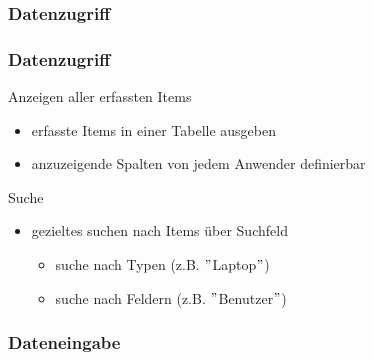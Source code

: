 \documentclass{beamer}
\begin{document}
\subsubsection{Datenzugriff}

\begin{frame}
\frametitle{Datenzugriff}

\begin{block}{Anzeigen aller erfassten Items}
\begin{itemize}
\item erfasste Items in einer Tabelle ausgeben
\item anzuzeigende Spalten von jedem Anwender definierbar
\end{itemize}
\end{block}

\begin{block}{Suche}
\begin{itemize}
\item gezieltes suchen nach Items über Suchfeld
\begin{itemize}
\item suche nach Typen (z.B. $"$Laptop$"$)
\item suche nach Feldern (z.B. $"$Benutzer$"$)
\end{itemize}
\end{itemize}
\end{block}

\end{frame}

\subsubsection{Dateneingabe}
\end{document}
